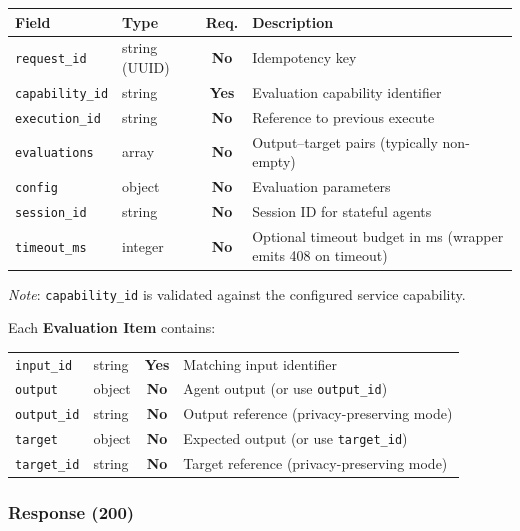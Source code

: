 \documentclass[11pt,a4paper]{article}
\newcommand{\field}[1]{\texttt{#1}}
\newcommand{\required}{\textbf{Yes}}
\newcommand{\optional}{\textbf{No}}
\begin{document}
\begin{center}\small
\begin{tabularx}{\textwidth}{@{}llcX@{}}
\toprule
\textbf{Field} & \textbf{Type} & \textbf{Req.} & \textbf{Description} \\
\midrule
\field{request\_id}    & string (UUID) & \optional & Idempotency key \\
\field{capability\_id} & string        & \required & Evaluation capability identifier \\
\field{execution\_id}  & string        & \optional & Reference to previous execute \\
\field{evaluations}    & array         & \optional & Output--target pairs (typically non-empty) \\
\field{config}         & object        & \optional & Evaluation parameters \\
\field{session\_id}    & string        & \optional & Session ID for stateful agents \\
\field{timeout\_ms}    & integer       & \optional & Optional timeout budget in ms (wrapper emits 408 on timeout) \\
\bottomrule
\end{tabularx}
\end{center}

\textit{Note}: \field{capability\_id} is validated against the configured service capability.

Each \textbf{Evaluation Item} contains:

\begin{center}\small
\begin{tabularx}{\textwidth}{@{}llcX@{}}
\toprule
\field{input\_id}   & string & \required & Matching input identifier \\
\field{output}      & object & \optional & Agent output (or use \field{output\_id}) \\
\field{output\_id}  & string & \optional & Output reference (privacy-preserving mode) \\
\field{target}      & object & \optional & Expected output (or use \field{target\_id}) \\
\field{target\_id}  & string & \optional & Target reference (privacy-preserving mode) \\
\bottomrule
\end{tabularx}
\end{center}

\subsubsection{Response (200)}
\end{document}
